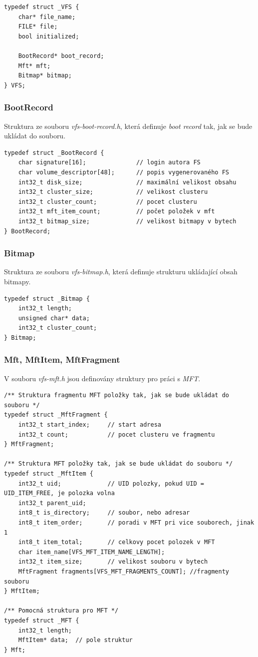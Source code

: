 \documentclass[12pt, a4paper]{report}
\begin{document}
\begin{lstlisting}
typedef struct _VFS {
	char* file_name;
	FILE* file;
	bool initialized;
	
	BootRecord* boot_record;
	Mft* mft;
	Bitmap* bitmap;
} VFS;
\end{lstlisting}

\subsubsection*{BootRecord}
Struktura ze souboru \emph{vfs-boot-record.h}, která definuje \emph{boot record} tak, jak se bude ukládat do souboru.

\begin{lstlisting}
typedef struct _BootRecord {
	char signature[16];              // login autora FS
	char volume_descriptor[48];      // popis vygenerovaného FS
	int32_t disk_size;               // maximální velikost obsahu
	int32_t cluster_size;            // velikost clusteru
	int32_t cluster_count;           // pocet clusteru
	int32_t mft_item_count;          // počet položek v mft
	int32_t bitmap_size;             // velikost bitmapy v bytech
} BootRecord;
\end{lstlisting}

\subsubsection*{Bitmap}
Struktura ze souboru \emph{vfs-bitmap.h}, která definuje strukturu ukládající obsah bitmapy.

\begin{lstlisting}
typedef struct _Bitmap {
	int32_t length;
	unsigned char* data;
	int32_t cluster_count;
} Bitmap;
\end{lstlisting}

\newpage
\subsubsection*{Mft, MftItem, MftFragment}
V souboru \emph{vfs-mft.h} jsou definovány struktury pro práci s \emph{MFT}.

\begin{lstlisting}
/** Struktura fragmentu MFT položky tak, jak se bude ukládat do souboru */
typedef struct _MftFragment {
	int32_t start_index;     // start adresa
	int32_t count;           // pocet clusteru ve fragmentu
} MftFragment;

/** Struktura MFT položky tak, jak se bude ukládat do souboru */
typedef struct _MftItem {
	int32_t uid;             // UID polozky, pokud UID = UID_ITEM_FREE, je polozka volna
	int32_t parent_uid;
	int8_t is_directory;     // soubor, nebo adresar
	int8_t item_order;       // poradi v MFT pri vice souborech, jinak 1
	int8_t item_total;       // celkovy pocet polozek v MFT
	char item_name[VFS_MFT_ITEM_NAME_LENGTH];
	int32_t item_size;       // velikost souboru v bytech
	MftFragment fragments[VFS_MFT_FRAGMENTS_COUNT]; //fragmenty souboru
} MftItem;

/** Pomocná struktura pro MFT */
typedef struct _MFT {
	int32_t length;
	MftItem* data;  // pole struktur
} Mft;
\end{lstlisting}
\end{document}
